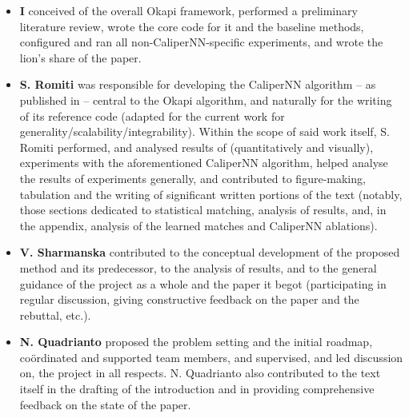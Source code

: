 %
{\renewcommand\labelitemi{}
%
\begin{itemize}
  \item 
    \textbf{I} conceived of the overall Okapi framework, performed a preliminary literature review,
    wrote the core code for it and the baseline methods, configured and ran all
    non-CaliperNN-specific experiments, and wrote the lion's share of the paper.
  \item 
    \textbf{S. Romiti} was responsible for developing the CaliperNN algorithm -- as published in
    \citet{RomInsShaQua22} -- central to the Okapi algorithm, and naturally for the writing of its
    reference code (adapted for the current work for generality/scalability/integrability).
    Within the scope of said work itself, S. Romiti performed, and analysed results of
    (quantitatively and visually), experiments with the aforementioned CaliperNN algorithm,  helped
    analyse the results of experiments generally, and contributed to figure-making, tabulation and
    the writing of significant written portions of the text (notably, those sections dedicated to
    statistical matching, analysis of results, and, in the appendix, analysis of the learned
    matches and CaliperNN ablations).
  \item 
    \textbf{V. Sharmanska} contributed to the conceptual development of the proposed method and its
    predecessor, to the analysis of results, and to the general guidance of the project as a whole
    and the paper it begot (participating in regular discussion, giving constructive feedback on
    the paper and the rebuttal, etc.).
  \item 
    \textbf{N. Quadrianto} proposed the problem setting and the initial roadmap, co\"ordinated
    and supported team members, and supervised, and led discussion on, the project in all respects.
    N. Quadrianto also contributed to the text itself in the drafting of the introduction and in
    providing comprehensive feedback on the state of the paper.
\end{itemize}
%
}
